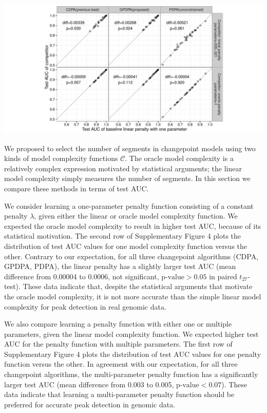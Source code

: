 \documentclass{article}
\begin{document}
\includegraphics[width=\textwidth]{figure-all-cv-learned-oracle-compare}

We proposed to select the number of
segments in changepoint models using two kinds of model complexity
functions $\mathcal C$. The oracle model complexity
is a relatively complex expression
 motivated by statistical arguments; the linear model complexity
simply measures the number of segments. In this section we compare
these methods in terms of test AUC.

We consider learning a one-parameter penalty function consisting of a
constant penalty $\lambda$, given either the linear or oracle model
complexity function. We expected the oracle model complexity to result
in higher test AUC, because of its statistical motivation. The second
row of Supplementary Figure 4 plots the distribution of test AUC
values for one model complexity function versus the other. Contrary to
our expectation, for all three changepoint algorithms (CDPA, GPDPA,
PDPA), the linear penalty has a slightly larger test AUC (mean
difference from 0.00004 to 0.0006, not significant, $\text{p-value}>0.05$ in paired
$t_{27}$-test). These data indicate that, despite the statistical
arguments that motivate the oracle model complexity, it is not more
accurate than the simple linear model complexity for peak detection in
real genomic data.

We also compare learning a penalty function with either one or
multiple parameters, given the linear model complexity function. We
expected higher test AUC for the penalty function with multiple
parameters. The first row of Supplementary Figure 4 plots the
distribution of test AUC values for one penalty function versus the
other. In agreement with our expectation, for all three changepoint
algorithms, the multi-parameter penalty function has a significantly
larger test AUC (mean difference from 0.003 to 0.005, $\text{p-value}<0.07$). These
data indicate that learning a multi-parameter penalty function should
be preferred for accurate peak detection in genomic data.
\end{document}
